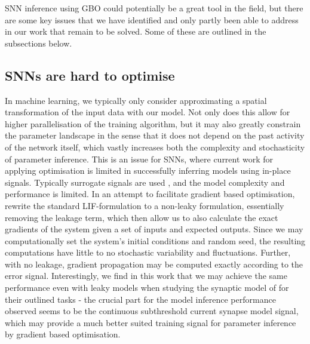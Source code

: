\documentclass[mphil,deptreport,ianc]{infthesis} %
\begin{document}
SNN inference using GBO could potentially be a great tool in the field, but there are some key issues that we have identified and only partly been able to address in our work that remain to be solved. Some of these are outlined in the subsections below.


\subsection*{SNNs are hard to optimise}

In machine learning, we typically only consider approximating a spatial transformation of the input data with our model. Not only does this allow for higher parallelisation of the training algorithm, but it may also greatly constrain the parameter landscape in the sense that it does not depend on the past activity of the network itself, which vastly increases both the complexity and stochasticity of parameter inference. 
This is an issue for SNNs, where current work for applying optimisation is limited in successfully inferring models using in-place signals. Typically surrogate signals are used \cite{Neftci2019, Tavanaei2019}, and the model complexity and performance is limited.
In an attempt to facilitate gradient based optimisation, \cite{Huh2017, Huh2018} rewrite the standard LIF-formulation to a non-leaky formulation, essentially removing the leakage term, which then allow us to also calculate the exact gradients of the system given a set of inputs and expected outputs.
Since we may computationally set the system’s initial conditions and random seed, the resulting computations have little to no stochastic variability and fluctuations. 
Further, with no leakage, gradient propagation may be computed exactly according to the error signal.
Interestingly, we find in this work that we may achieve the same performance even with leaky models when studying the synaptic model of \cite{Huh2018} for their outlined tasks - the crucial part for the model inference performance observed seems to be the continuous subthreshold current synapse model signal, which may provide a much better suited training signal for parameter inference by gradient based optimisation.
\end{document}
